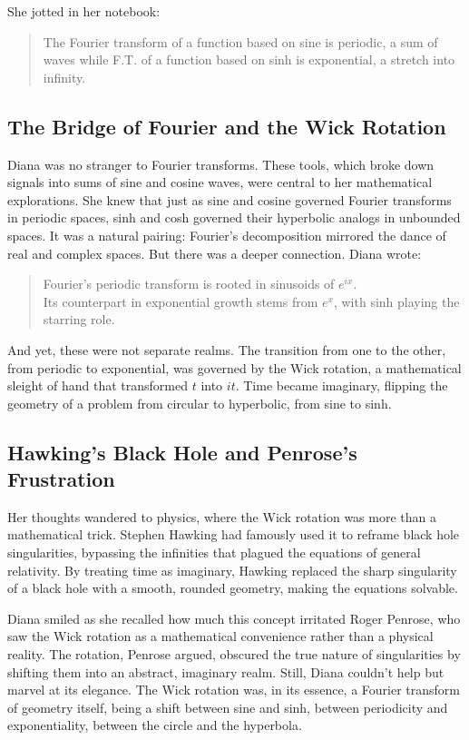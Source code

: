 She jotted in her notebook:
\begin{quote}
The Fourier transform of a function based on sine is periodic, a sum of waves while F.T. of a function based on sinh is exponential, a stretch into infinity.
\end{quote}

\subsection*{The Bridge of Fourier and the Wick Rotation}

Diana was no stranger to Fourier transforms. These tools, which broke down signals into sums of sine and cosine waves, were central to her mathematical explorations. She knew that just as sine and cosine governed Fourier transforms in periodic spaces, sinh and cosh governed their hyperbolic analogs in unbounded spaces. It was a natural pairing: Fourier’s decomposition mirrored the dance of real and complex spaces. But there was a deeper connection. Diana wrote:

\begin{quote}
Fourier’s periodic transform is rooted in sinusoids of \(e^{ix}\).\\
Its counterpart in exponential growth stems from \(e^x\), with sinh playing the starring role.
\end{quote}

And yet, these were not separate realms. The transition from one to the other, from periodic to exponential, was governed by the Wick rotation, a mathematical sleight of hand that transformed \(t\) into \(it\). Time became imaginary, flipping the geometry of a problem from circular to hyperbolic, from sine to sinh.

\subsection*{Hawking’s Black Hole and Penrose’s Frustration}

Her thoughts wandered to physics, where the Wick rotation was more than a mathematical trick. Stephen Hawking had famously used it to reframe black hole singularities, bypassing the infinities that plagued the equations of general relativity. By treating time as imaginary, Hawking replaced the sharp singularity of a black hole with a smooth, rounded geometry, making the equations solvable.

Diana smiled as she recalled how much this concept irritated Roger Penrose, who saw the Wick rotation as a mathematical convenience rather than a physical reality. The rotation, Penrose argued, obscured the true nature of singularities by shifting them into an abstract, imaginary realm. Still, Diana couldn’t help but marvel at its elegance. The Wick rotation was, in its essence, a Fourier transform of geometry itself, being a shift between sine and sinh, between periodicity and exponentiality, between the circle and the hyperbola.

